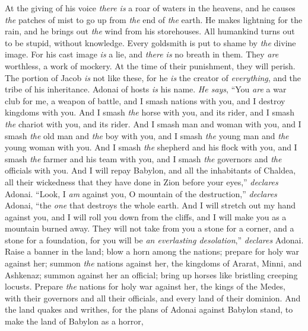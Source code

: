 \begin{biblechapter}
\verse At the giving of his voice 
\textit{there is} a roar of waters in the heavens, 
and he causes \textit{the} patches of mist 
to go up from \textit{the} end of \textit{the} earth. 
He makes lightning for the rain, 
and he brings out \textit{the} wind from his storehouses.
\verse All humankind turns out to be stupid, 
without knowledge. 
Every goldsmith is put to shame 
by \textit{the} divine image. 
For his cast image \textit{is} a lie, 
and \textit{there is} no breath in them.
\verse They \textit{are} worthless, 
a work of mockery. 
At the time of their punishment, 
they will perish.
\verse The portion of Jacob \textit{is} not like these, 
for he \textit{is} the creator of \textit{everything}, 
and the tribe of his inheritance. 
Adonai of hosts \textit{is} his name.
\verse \textit{He says}, “You \textit{are} a war club for me, 
a weapon of battle, 
and I smash nations with you, 
and I destroy kingdoms with you.
\verse And I smash \textit{the} horse with you, 
and its rider, 
and I smash \textit{the} chariot with you, 
and its rider.
\verse And I smash man and woman with you, 
and I smash \textit{the} old man and \textit{the} boy with you, 
and I smash \textit{the} young man and \textit{the} young woman with you.
\verse And I smash \textit{the} shepherd and his flock with you, 
and I smash \textit{the} farmer and his team with you, 
and I smash \textit{the} governors and \textit{the} officials with you.
\verse And I will repay Babylon, 
and all the inhabitants of Chaldea, 
all their wickedness that they have done in Zion 
before your eyes,” \textit{declares} Adonai.
\verse “Look, I \textit{am} against you, 
O mountain of the destruction,” \textit{declares} Adonai, 
“the \textit{one} that destroys the whole earth. 
And I will stretch out my hand against you, 
and I will roll you down from the cliffs, 
and I will make you as a mountain burned away.
\verse They will not take from you 
a stone for a corner, 
and a stone for a foundation, 
for you will be \textit{an everlasting desolation},” \textit{declares} Adonai.
\verse Raise a banner in the land; 
blow a horn among the nations; 
prepare for holy war against her; 
summon \textit{the} nations against her, 
the kingdoms of Ararat, Minni, and Ashkenaz; 
summon against her an official; 
bring up horses like bristling creeping locusts.
\verse Prepare \textit{the} nations for holy war against her, 
the kings of the Medes, 
with their governors and all their officials, 
and every land of their dominion.
\verse And the land quakes and writhes, 
for the plans of Adonai against Babylon stand, 
to make the land of Babylon as a horror, 

\end{biblechapter}
